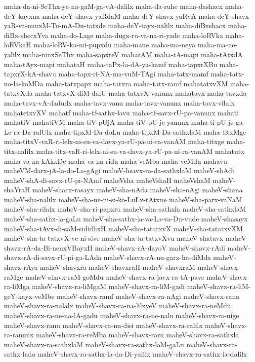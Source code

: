 {maha-da-ni-SeThx-ye-na-gaM-ga-vA-dalilx
maha-da-ruhe
maha-dashacx
maha-deY-kayxna
maha-deY-shavx-yaRdaM
maha-deY-shavx-yaRvA
maha-deY-shavx-yaR-va-nunxM-Tu-mA-Du-tatxde
maha-deY-tayx-nalilx
maha-diBxshacx
maha-diBx-shecxYva
maha-do-Lage
maha-dugx-ru-va-na-ri-yade
maha-loRVka
maha-loRVkaH
maha-loRV-ka-mi-pupxdu
maha-mane
maha-ma-neya
maha-ma-ne-yalilx
maha-ninxSeThx
maha-sapxteV
mahatAM
maha-tA-mapi
maha-tAtxdA
maha-tAyx-mapi
mahataH
maha-taPx-la-dA-ya-kamf
maha-tapxrXBu
maha-tapxrX-kA-shavu
maha-tapx-ri-NA-ma-vuM-TAgi
maha-tatx-mamf
maha-tatx-no-la-koMDa
maha-tatxpapx
maha-tatxra
maha-tatx-ramf
mahatatxvXM
maha-tatxvXda
maha-tatxvX-diM-dalU
maha-tatxvX-vanunx
mahatavx
maha-tavxda
maha-tavx-vA-dadudx
maha-tavx-vanu
maha-tavx-vanunx
maha-tavx-vilalx
mahatetxvXV
mahatf
maha-tf-sathx-lavu
maha-tf-savx-rU-pa-vanunx
mahati
mahatiV
mahatiVM
maha-tiV-pUjA
maha-tiV-pU-je-yanunx
maha-ti-pU-je-ga-Le-ra-Da-ralUlx
maha-tipxM-Da-doLu
maha-tipxM-Da-sathxlaM
maha-titxMge
maha-titxV-vaR-ri-lelx-ni-su-va-davx-ya-rU-pa-ni-ra-vanAM
maha-titxge
maha-titx-nalilx
maha-titx-vaR-ri-lelx-ni-su-va-davx-ya-rU-pa-ni-ra-vanAM
mahatutx
maha-va-na-kAkxDe
maha-va-na-ridu
maha-veMba
maha-veMdu
mahavu
maheVM-darx-jA-la-do-La-gAgi
maheV-hsavx-ra-da-sathxlaM
maheV-shAdi
maheV-shA-di-savx-rU-pi-NAmf
maheVsha
maheVshaH
maheVshaM
maheV-shaYraH
maheV-shacx-rasayx
maheV-sha-nAda
maheV-sha-nAgi
maheV-shana
maheV-sha-nalilx
maheV-sha-ne-ni-si-ko-LuLx-tAtxne
maheV-sha-parx-vaNaM
maheV-sha-rilalx
maheV-sha-ri-papxru
maheV-sha-sathxla
maheV-sha-sathxlaM
maheV-sha-sathx-la-gaLu
maheV-sha-sathx-la-va-La-va-Du-vude
maheV-shasayx
maheV-sha-tAvx-di-saM-sididhxH
maheV-sha-tatatxvX
maheV-sha-tatatxvXM
maheV-sha-ta-tatxvX-ve-ni-sive
maheV-sha-ta-tatxvXvu
maheV-shatavx
maheV-shavx-rA-da-Bi-nenxVBayxH
maheV-shavx-rA-dayoV
maheV-shavx-rAdi
maheV-shavx-rA-di-savx-rU-pi-ga-LAda
maheV-shavx-rA-nu-garx-ha-diMda
maheV-shavx-rAya
maheV-shavxra
maheV-shavxraH
maheV-shavxraM
maheV-shavx-raMge
maheV-shavx-raM-goMdu
maheV-shavx-ra-javx-ra-tA-pave
maheV-shavx-ra-liMga
maheV-shavx-ra-liMgaM
maheV-shavx-ra-liM-gadi
maheV-shavx-ra-liM-geY-kayx-veMbe
maheV-shavx-ramf
maheV-shavx-ra-nAgi
maheV-shavx-rana
maheV-shavx-ra-nalalx
maheV-shavx-ra-na-lilxyeV
maheV-shavx-ra-neMdu
maheV-shavx-ra-ne-na-lA-gadu
maheV-shavx-ra-ne-nalu
maheV-shavx-ra-nige
maheV-shavx-ranu
maheV-shavx-ra-nu-disi
maheV-shavx-ra-ralilx
maheV-shavx-ra-ranunx
maheV-shavx-ra-reMba
maheV-shavx-raru
maheV-shavx-ra-sathxla
maheV-shavx-ra-sathxlaM
maheV-shavx-ra-sathx-laM-gaLu
maheV-shavx-ra-sathx-lada
maheV-shavx-ra-sathx-la-da-Di-yalilx
maheV-shavx-ra-sathx-la-dalilx
}
